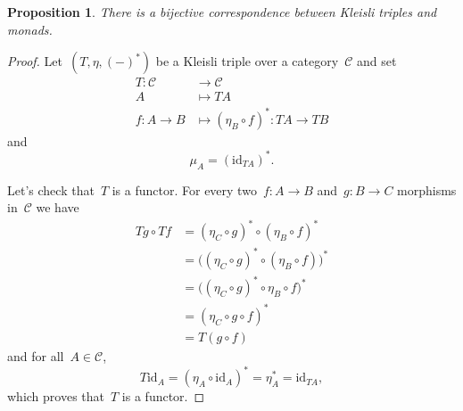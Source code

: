 \documentclass[a4paper]{article}
\theoremstyle{plain}
\newtheorem{proposition}[theorem]{Proposition}
\theoremstyle{definition}
\newcommand{\id}{\mathrm{id}}
\newcommand{\cat}[1]{\mathcal{#1}}
\begin{document}
\begin{proposition}
    There is a bijective correspondence between Kleisli triples and monads.
\end{proposition}
\begin{proof}
    Let~\((T, \eta, (-)^{\ast})\) be a Kleisli triple
    over a category~\(\cat{C}\)
    and set
    \begin{equation}
        \label{eq:monad-unit-in-kleisli-trip}
        \begin{split}
            T:\cat{C} & \longrightarrow\cat{C} \\
            A & \longmapsto TA \\
            f:A\rightarrow B & \longmapsto
            (\eta_{B}\circ f)^{\ast}:TA\longrightarrow TB
        \end{split}
    \end{equation}
    and
    \begin{equation}
        \label{eq:monad-prod-in-kleisli-trip}
        \mu_{A} = (\id_{TA})^{\ast}.
    \end{equation}

    Let's check that~\(T\) is a functor.
    For every two~\(f:A\longrightarrow B\)
    and~\(g:B\longrightarrow C\)
    morphisms in~\(\cat{C}\)
    we have
    \begin{align*}
        Tg\circ Tf &= (\eta_{C}\circ g)^{\ast}\circ
                      (\eta_{B}\circ f)^{\ast} \\
                   &= \bigl((\eta_{C}\circ g)^{\ast}\circ
                      (\eta_{B}\circ f)\bigr)^{\ast} \\
                   &= \bigl((\eta_{C}\circ g)^{\ast}\circ
                      \eta_{B}\circ f\bigr)^{\ast} \\
                   &= (\eta_{C}\circ g\circ f)^{\ast} \\
                   &= T(g\circ f)
    \end{align*}
    and for all~\(A\in\cat{C}\),
    \[
        T\id_{A} = (\eta_{A}\circ \id_{A})^{\ast} = \eta_{A}^{\ast} = \id_{TA},
    \]
    which proves that~\(T\) is a functor.


\end{proof}
\end{document}

